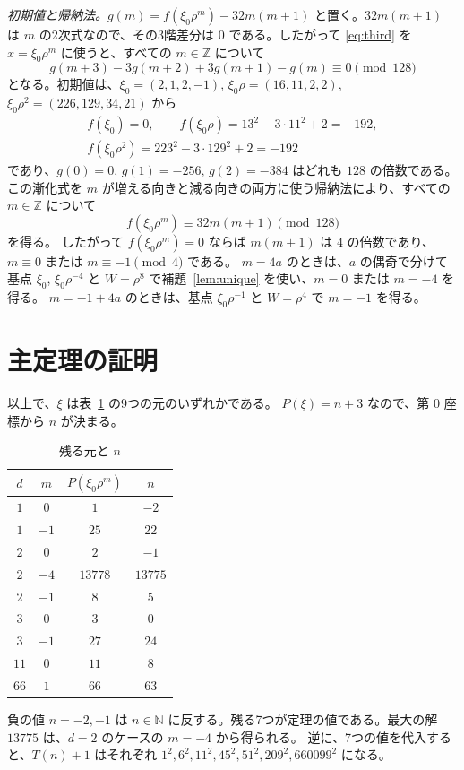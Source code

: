 \documentclass[a4paper,11pt]{ltjsarticle}
\makeatletter
\theoremstyle{jplain}
\renewcommand{\proofname}{証明}
\renewenvironment{proof}[1][\proofname]{\par\pushQED{\qed}\normalfont\topsep6\p@\@plus6\p@\relax
  \trivlist\item[\hskip\labelsep\bfseries #1]\ignorespaces}{\popQED\endtrivlist\@endpefalse}
\numberwithin{equation}{section}
\numberwithin{table}{section}
\newcommand{\Z}{\mathbb{Z}}
\newcommand{\N}{\mathbb{N}}
\makeatother
\begin{document}
\emph{初期値と帰納法。}$g(m)=f(\xi_0\rho^m)-32m(m+1)$ と置く。$32m(m+1)$ は $m$ の2次式なので、その3階差分は $0$ である。したがって \eqref{eq:third} を $x=\xi_0\rho^m$ に使うと、すべての $m\in\Z$ について
\[
g(m+3)-3g(m+2)+3g(m+1)-g(m)\equiv0\pmod{128}
\]
となる。初期値は、$\xi_0=(2,1,2,-1)$, $\xi_0\rho=(16,11,2,2)$, $\xi_0\rho^2=(226,129,34,21)$ から
\begin{gather*}
f(\xi_0)=0,\qquad f(\xi_0\rho)=13^2-3\cdot11^2+2=-192,\\
f(\xi_0\rho^2)=223^2-3\cdot129^2+2=-192
\end{gather*}
であり、$g(0)=0$, $g(1)=-256$, $g(2)=-384$ はどれも $128$ の倍数である。
この漸化式を $m$ が増える向きと減る向きの両方に使う帰納法により、すべての $m\in\Z$ について
\begin{equation}\label{eq:entrance}
f(\xi_0\rho^m)\equiv32m(m+1)\pmod{128}
\end{equation}
を得る。
したがって $f(\xi_0\rho^m)=0$ ならば $m(m+1)$ は $4$ の倍数であり、$m\equiv0$ または $m\equiv-1\pmod4$ である。
$m=4a$ のときは、$a$ の偶奇で分けて基点 $\xi_0$, $\xi_0\rho^{-4}$ と $W=\rho^8$ で補題~\ref{lem:unique} を使い、$m=0$ または $m=-4$ を得る。
$m=-1+4a$ のときは、基点 $\xi_0\rho^{-1}$ と $W=\rho^4$ で $m=-1$ を得る。

\section{主定理の証明}\label{sec:conclusion}

\begin{proof}[定理~\ref{thm:main} の証明]
以上で、$\xi$ は表~\ref{tab:values} の9つの元のいずれかである。
$P(\xi)=n+3$ なので、第 $0$ 座標から $n$ が決まる。

\begin{table}[htbp]
\centering
\caption{残る元と $n$}\label{tab:values}
\begin{tabular}{cccc}
\toprule
$d$ & $m$ & $P(\xi_0\rho^m)$ & $n$\\
\midrule
$1$ & $0$ & $1$ & $-2$\\
$1$ & $-1$ & $25$ & $22$\\
$2$ & $0$ & $2$ & $-1$\\
$2$ & $-4$ & $13778$ & $13775$\\
$2$ & $-1$ & $8$ & $5$\\
$3$ & $0$ & $3$ & $0$\\
$3$ & $-1$ & $27$ & $24$\\
$11$ & $0$ & $11$ & $8$\\
$66$ & $1$ & $66$ & $63$\\
\bottomrule
\end{tabular}
\end{table}

負の値 $n=-2,-1$ は $n\in\N$ に反する。残る7つが定理の値である。最大の解 $13775$ は、$d=2$ のケースの $m=-4$ から得られる。
逆に、7つの値を代入すると、$T(n)+1$ はそれぞれ $1^2,6^2,11^2,45^2,51^2,209^2,660099^2$ になる。
\end{proof}
\end{document}
